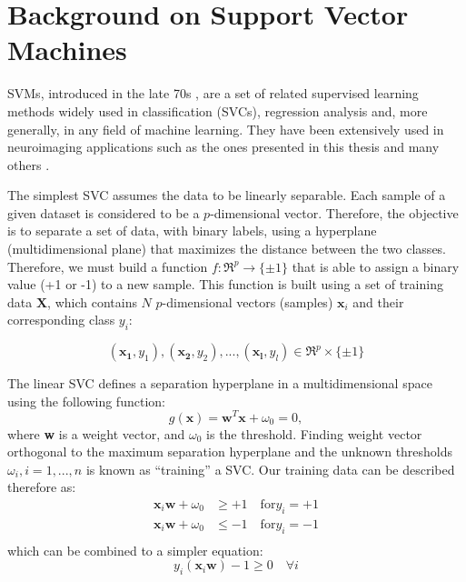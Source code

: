 \chapter{Background on Support Vector Machines}\label{ch:svm}
\acfp{SVM}, introduced in the late 70s \cite{Vapnik1998}, are a set of related supervised learning methods widely used in classification (\acp{SVC}), regression analysis and, more generally, in any field of machine learning. They have been extensively used in neuroimaging applications such as the ones presented in this thesis \cite{Martinez-Murcia2013255,Martinez-Murcia201458,martinez2014parametrization,Martinez-Murcia2015,Martinez-Murcia2016,Martinez-Murcia2016a} and many others \cite{Stoeckel04,Towey2011,Illan2011,Illan2012,Ortiz2013,Segovia2016a}.

The simplest \ac{SVC} assumes the data to be linearly separable. Each sample of a given dataset is considered to be a $p$-dimensional vector. Therefore, the objective is to separate a set of data, with binary labels, using a hyperplane (multidimensional plane) that maximizes the distance between the two classes. Therefore, we must build a function $f : \Re^p \rightarrow \lbrace \pm1 \rbrace$ that is able to assign a binary value (+1 or -1) to a new sample. This function is built using a set of training data $\mathbf{X}$, which contains $N$ $p$-dimensional vectors (samples) $\mathbf{x}_i$ and their corresponding class $y_i$: 

\begin{equation}
(\mathbf{x_1} , y_1 ), (\mathbf{x_2} , y_2 ), ..., (\mathbf{x_l} , y_l ) \in \Re^p \times \lbrace \pm 1\rbrace
\end{equation}

The linear \ac{SVC} defines a separation hyperplane in a multidimensional space using the following function: 
\begin{equation}
g(\textbf{x}) = \textbf{w}^T \textbf{x} + \omega_0 = 0,
\end{equation}
where \textbf{w} is a weight vector, and $\omega_0$ is the threshold. Finding weight vector orthogonal to the maximum separation hyperplane and the unknown thresholds  $\omega_i , i = 1,...,n$ is known as ``training'' a \ac{SVC}. Our training data can be described therefore as: 
\begin{align}
	\mathbf{x}_i\mathbf{w} + \omega_0 &\ge +1 \quad \text{for} y_i = +1\\
	\mathbf{x}_i\mathbf{w} + \omega_0 &\le -1 \quad \text{for} y_i = -1\\
\end{align}
which can be combined to a simpler equation:
\begin{equation}\label{eq:constraint}
	y_i(\mathbf{x}_i\mathbf{w})-1\ge 0 \quad \forall i
\end{equation}

